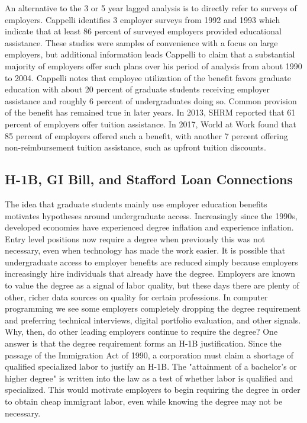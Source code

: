 \documentclass[review]{elsarticle}
\begin{document}
    An alternative to the 3 or 5 year lagged analysis is to directly refer to surveys of employers.
    Cappelli\cite{cappelli2004employers} identifies 3 employer surveys from 1992 and 1993 which indicate that at least 86 percent of surveyed employers provided educational assistance.
    These studies were samples of convenience with a focus on large employers,
    but additional information leads Cappelli to claim that a substantial majority of employers offer such plans over his period of analysis from about 1990 to 2004.
    Cappelli notes that employee utilization of the benefit favors graduate education
    with about 20 percent of graduate students receiving employer assistance
    and roughly 6 percent of undergraduates doing so.
    Common provision of the benefit has remained true in later years.
    In 2013, SHRM reported that 61 percent of employers offer tuition assistance\cite{cherry2014rejuvenating}.
    In 2017, World at Work found that 85 percent of employers offered such a benefit,
    with another 7 percent offering non-reimbursement tuition assistance, such as upfront tuition discounts\cite{talentculture_2018}.

    \subsection{H-1B, GI Bill, and Stafford Loan Connections}
    The idea that graduate students mainly use employer education benefits motivates hypotheses around undergraduate access.
    Increasingly since the 1990s, developed economies have experienced degree inflation and experience inflation.
    Entry level positions now require a degree when previously this was not necessary, even when technology has made the work easier.
    It is possible that undergraduate access to employer benefits are reduced simply because employers increasingly hire individuals that already have the degree.
    Employers are known to value the degree as a signal of labor quality, but these days there are plenty of other, richer data sources on quality for certain professions.
    In computer programming we see some employers completely dropping the degree requirement and preferring technical interviews, digital portfolio evaluation, and other signals.
    Why, then, do other leading employers continue to require the degree?
    One answer is that the degree requirement forms an H-1B justification.
    Since the passage of the Immigration Act of 1990\cite{law1990law}, a corporation must claim a shortage of qualified specialized labor to justify an H-1B.
    The "attainment of a bachelor's or higher degree" is written into the law as a test of whether labor is qualified and specialized.
    This would motivate employers to begin requiring the degree in order to obtain cheap immigrant labor, even while knowing the degree may not be necessary.
\end{document}
